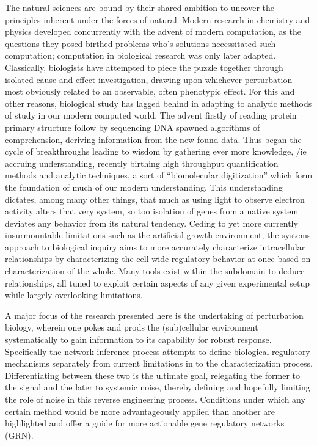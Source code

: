The natural sciences are bound by their shared ambition to uncover the principles inherent under the forces of natural. Modern research in chemistry and physics developed concurrently with the advent of modern computation, as the questions they posed birthed problems who's solutions necessitated such computation; computation in biological research was only later adapted. Classically, biologists have attempted to piece the puzzle together through isolated cause and effect investigation, drawing upon whichever perturbation most obviously related to an observable, often phenotypic effect. For this and other reasons, biological study has lagged behind in adapting to analytic methods of study in our modern computed world. The advent firstly of reading protein primary structure follow by sequencing DNA spawned algorithms of comprehension, deriving information from the new found data. Thus began the cycle of breakthroughs leading to wisdom by gathering ever more knowledge, /ie accruing understanding, recently birthing high throughput quantification methods and analytic techniques, a sort of ``biomolecular digitization'' which form the foundation of much of our modern understanding. This understanding dictates, among many other things, that much as using light to observe electron activity alters that very system, so too isolation of genes from a native system deviates any behavior from its natural tendency. Ceding to yet more currently insurmountable limitations such as the artificial growth environment, the systems approach to biological inquiry aims to more accurately characterize intracellular relationships by characterizing the cell-wide regulatory behavior at once based on characterization of the whole. Many tools exist within the subdomain to deduce relationships, all tuned to exploit certain aspects of any given experimental setup while largely overlooking limitations. %

A major focus of the research presented here is the undertaking of perturbation biology, wherein one pokes and prods the (sub)cellular environment systematically to gain information to its capability for robust response. Specifically the network inference process attempts to define biological regulatory mechanisms separately from current limitations in to the characterization process. Differentiating between these two is the ultimate goal, relegating the former to the signal and the later to systemic noise, thereby defining and hopefully limiting the role of noise in this reverse engineering process. Conditions under which any certain method would be more advantageously applied than another are highlighted and offer a guide for more actionable gene regulatory networks (GRN). %

